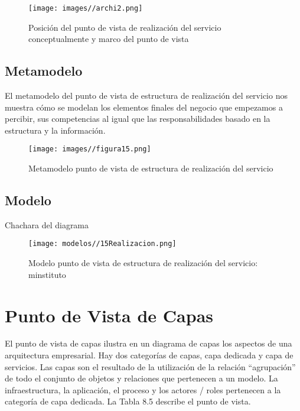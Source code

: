     \begin{figure}[H]
    	\centering
    	\texttt{[image: images//archi2.png]}
    	\captionsetup{width=.95\textwidth}
    	\caption{Posición del punto de vista de realización del servicio conceptualmente y marco del punto de vista}
    	\label{Fig:figura26}
    \end{figure}
    
    \subsection{Metamodelo}
    El metamodelo del punto de vista de estructura de realización del servicio nos muestra cómo se modelan los elementos finales del negocio que empezamos a percibir, sus competencias al igual que las responsabilidades basado en la estructura y la información.
    
    \begin{figure}[H]
    	\centering
    	\texttt{[image: images//figura15.png]}
    	\captionsetup{width=.95\textwidth}
    	\caption{Metamodelo punto de vista de estructura de realización del servicio}
    	\label{Fig:figura27}
    \end{figure}
    
    \subsection{Modelo}Chachara del diagrama
    \begin{figure}[H]
    	\centering
    	\texttt{[image: modelos//15Realizacion.png]}
    	\captionsetup{width=.95\textwidth}
    	\caption{Modelo punto de vista de estructura de realización del servicio: minstituto}
    	\label{Fig:modelo15}
    \end{figure}

\section{Punto de Vista de Capas}
El punto de vista de capas ilustra en un diagrama de capas los aspectos de una arquitectura
empresarial. Hay dos categorías de capas, capa dedicada y capa de servicios. Las capas
son el resultado de la utilización de la relación “agrupación” de todo el conjunto de objetos
y relaciones que pertenecen a un modelo. La infraestructura, la aplicación, el proceso
y los actores / roles pertenecen a la categoría de capa dedicada. La Tabla 8.5 describe el
punto de vista.
    
